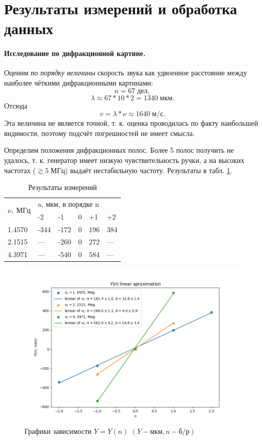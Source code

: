\documentclass[10pt, a4paper]{article}
\begin{document}
\section{Результаты измерений и обработка данных}
\paragraph{Исследование по дифракционной картине. }

Оценим \emph{по порядку величины} скорость звука как удвоенное расстояние между наиболее чёткими дифракционными картинами:
\[n = 67 \;дел,\]
\[\lambda \approx 67*10*2=1340 \; мкм. \]
Отсюда 
\[v = \lambda * \nu \approx 1640 \; м/с.\]
Эта величина не является точной, т. к. оценка проводилась по факту наибольшей видимости, поэтому подсчёт погрешностей не имеет смысла.

Определим положения дифракционных полос. Более 5 полос получить не удалось, т. к. генератор имеет низкую чувствительность ручки, а на высоких частотах ($ \gtrsim 5 \; МГц $) выдаёт нестабильную частоту. Результаты в табл. \ref{tab:result}.

\begin{table}[h]
	\centering
	\begin{tabular}{|l|l|l|l|l|l|}
		\hline
		\multirow{2}{*}{$\nu, \; МГц$} & \multicolumn{5}{l|}{a, мкм, в порядке n} \\ \cline{2-6} 
		& -2    & -1     & 0      & +1    & +2     \\ \hline
		1.4570                         & -344   & -172  & 0   & 196    & 384 \\ \hline
		2.1515                         & ---    & -260  & 0  & 272    & ---  \\ \hline
		4.3971                         & ---    & -540  & 0   & 584    & --- \\ \hline
	\end{tabular}
	\caption{Результаты измерений}
	\label{tab:result}
\end{table}

\begin{figure}[tbp]
	\centering
	\includegraphics[width=0.8\linewidth]{Figure_1.png}
	\caption{Графики зависимости $Y = Y(n)$
      $(Y - мкм, n - б/р)$}
	\label{fig:2}
\end{figure}
\end{document}
